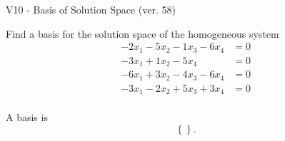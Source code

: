 \begin{exercise}
  \begin{exerciseTitle}V10 - Basis of Solution Space (ver. 58)\end{exerciseTitle}
  \begin{exerciseStatement}
    Find a basis for the solution space of the homogeneous system 
\begin{align*}
 -2 x_ 1 -5 x_ 2 -1 x_ 3 -6 x_ 4 &= 0  \\ 
  -3 x_ 1 + 1 x_ 2 -5 x_ 4 &= 0  \\ 
  -6 x_ 1 + 3 x_ 2 -4 x_ 3 -6 x_ 4 &= 0  \\ 
  -3 x_ 1 -2 x_ 2 + 5 x_ 3 + 3 x_ 4 &= 0  \\ 
 \end{align*}


 
  \end{exerciseStatement}

  \begin{exerciseAnswer}
   A basis is   
\[\left\{\right\}.\]

  


  \end{exerciseAnswer}
\end{exercise}